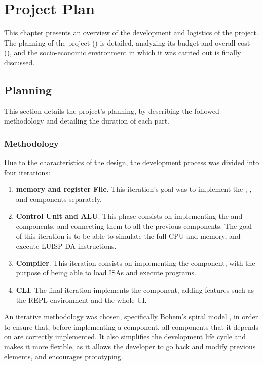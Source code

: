 \chapter{Project Plan}\label{chap:planning}
This chapter presents an overview of the development and logistics of the project. The planning of the project () is detailed, analyzing its budget and overall cost (), and the socio-economic environment in which it was carried out is finally discussed.


\section{Planning}\label{sec:planning}
This section details the project's planning, by describing the followed methodology and detailing the duration of each part.

\subsection{Methodology}
Due to the characteristics of the design, the development process was divided into four iterations:
\begin{enumerate}[label=\Roman*.]
  \item \textbf{\Gls{memory} and \Gls{register} File}. This iteration's goal was to implement the , , and  components separately.
  \item \textbf{Control Unit and \gls{ALU}}. This phase consists on implementing the  and  components, and connecting them to all the previous components. The goal of this iteration is to be able to simulate the full \gls{CPU} and \gls{memory}, and execute LUISP-DA instructions.
  \item \textbf{Compiler}. This iteration consists on implementing the  component, with the purpose of being able to load \glspl{ISA} and execute programs.
  \item \textbf{\gls{CLI}}. The final iteration implements the  component, adding features such as the \gls{REPL environment} and the whole \gls{UI}.
\end{enumerate}

An iterative methodology was chosen, specifically Bohem's spiral model \parencite{BohemBSpiral}, in order to ensure that, before implementing a component, all components that it depends on are correctly implemented. It also simplifies the development life cycle and makes it more flexible, as it allows the developer to go back and modify previous elements, and encourages prototyping.

